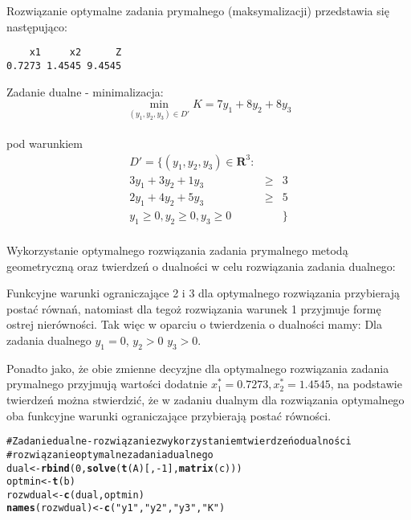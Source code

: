 \documentclass[11pt]{article}\usepackage{graphicx, color}
\makeatletter
\newcommand{\hlfunctioncall}[1]{\textcolor[rgb]{0.501960784313725,0,0.329411764705882}{\textbf{#1}}}%
\newcommand{\hlstring}[1]{\textcolor[rgb]{0.6,0.6,1}{#1}}%
\newcommand{\hlcomment}[1]{\textcolor[rgb]{0.180392156862745,0.6,0.341176470588235}{#1}}%
\newenvironment{kframe}{%
 \def\at@end@of@kframe{}%
 \ifinner\ifhmode%
  \def\at@end@of@kframe{\end{minipage}}%
  \begin{minipage}{\columnwidth}%
 \fi\fi%
 \def\FrameCommand##1{\hskip\@totalleftmargin \hskip-\fboxsep
 \colorbox{shadecolor}{##1}\hskip-\fboxsep
     \hskip-\linewidth \hskip-\@totalleftmargin \hskip\columnwidth}%
 \MakeFramed {\advance\hsize-\width
   \@totalleftmargin\z@ \linewidth\hsize
   \@setminipage}}%
 {\par\unskip\endMakeFramed%
 \at@end@of@kframe}
\newenvironment{knitrout}{}{} %
\makeatother
\begin{document}
Rozwiązanie optymalne zadania prymalnego (maksymalizacji) przedstawia się następująco:
\begin{knitrout}
\color{fgcolor}\begin{kframe}
\begin{verbatim}
    x1     x2      Z 
0.7273 1.4545 9.4545 
\end{verbatim}
\end{kframe}
\end{knitrout}


Zadanie dualne - minimalizacja:
\begin{equation*} \min_{(y_1,y_2,y_3) \in D'} K= 7y_1+8y_2+8y_3\end{equation*}\\
pod warunkiem
\begin{eqnarray*}
D'=\{(y_1,y_2,y_3) \in \mathbf{R}^3: \\ 
3y_1+3y_2+1y_3 &  \ge & 3    \\
2y_1+4y_2+5y_3 &\ge & 5   \\
y_1 \ge 0, y_2 \ge 0, y_3 \ge 0 & &\} \\
\end{eqnarray*} 

Wykorzystanie optymalnego rozwiązania zadania prymalnego metodą geometryczną oraz twierdzeń o dualności w celu rozwiązania zadania dualnego:

Funkcyjne warunki ograniczające 2 i 3 dla optymalnego rozwiązania przybierają postać równań, natomiast dla tegoż rozwiązania warunek 1 przyjmuje formę ostrej nierówności.
Tak więc w oparciu o twierdzenia o dualności mamy:
Dla zadania dualnego $y_1=0$, $y_2>0$ $y_3>0$.

Ponadto jako, że obie zmienne decyzjne dla optymalnego rozwiązania zadania prymalnego przyjmują wartości dodatnie $x_1^\ast=0.7273, x_2^\ast=1.4545$, na podstawie twierdzeń można stwierdzić, że w zadaniu dualnym dla rozwiązania optymalnego oba funkcyjne warunki ograniczające przybierają postać równości. 

\begin{knitrout}
\color{fgcolor}\begin{kframe}
\begin{alltt}

\hlcomment{# Zadanie dualne - rozwiązanie z wykorzystaniem twierdzeń o dualności}
\hlcomment{# rozwiązanie optymalne zadania dualnego}
dual <- \hlfunctioncall{rbind}(0, \hlfunctioncall{solve}(\hlfunctioncall{t}(A)[, -1], \hlfunctioncall{matrix}(c)))
optmin <- \hlfunctioncall{t}(b) %*% dual
rozwdual <- \hlfunctioncall{c}(dual, optmin)
\hlfunctioncall{names}(rozwdual) <- \hlfunctioncall{c}(\hlstring{"y1"}, \hlstring{"y2"}, \hlstring{"y3"}, \hlstring{"K"})
\end{alltt}
\end{kframe}
\end{knitrout}
\end{document}
